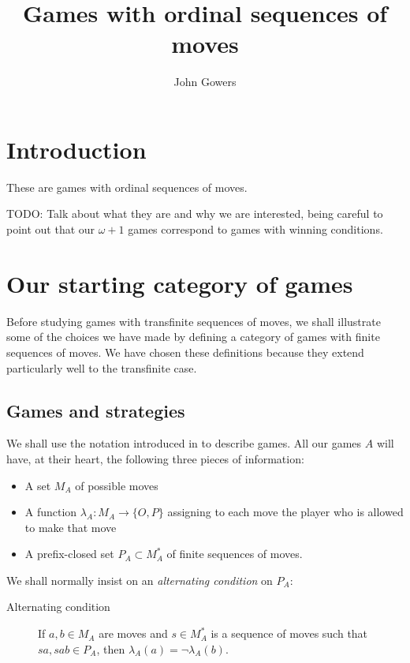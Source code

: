 \documentclass[11pt]{article} %
\title{Games with ordinal sequences of moves}
\author{John Gowers}
\date{}
\theoremstyle{plain} %
\theoremstyle{definition} %
\theoremstyle{note}
\theoremstyle{exercisestyle}
\newcommand*\from{\colon}
\newcommand{\cmap}[3]{#1\from{}#2\to{}#3}
\newcommand{\OP}{\{O,P\}}
\begin{document}
\maketitle

\tableofcontents

\setcounter{tocdepth}{2}

\section{Introduction}

These are games with ordinal sequences of moves.

TODO: Talk about what they are and why we are interested, being careful to point out that our $\omega+1$ games correspond to games with winning conditions.

\section{Our starting category of games}

Before studying games with transfinite sequences of moves, we shall illustrate some of the choices we have made by defining a category of games with finite sequences of moves.  We have chosen these definitions because they extend particularly well to the transfinite case.  

\subsection{Games and strategies}

We shall use the notation introduced in \cite{abramskyjagadeesangames} to describe games.  All our games $A$ will have, at their heart, the following three pieces of information:
\begin{itemize}
  \item A set $M_A$ of possible moves
  \item A function $\cmap{\lambda_A}{M_A}{\OP}$ assigning to each move the player who is allowed to make that move
  \item A prefix-closed set $P_A\subset M_A^*$ of finite sequences of moves.
\end{itemize}
We shall normally insist on an \emph{alternating condition} on $P_A$:
\begin{description}
  \item[Alternating condition] If $a,b\in M_A$ are moves and $s\in M_A^*$ is a sequence of moves such that $sa, sab\in P_A$, then $\lambda_A(a)=\neg\lambda_A(b)$.
\end{description}
\end{document}
